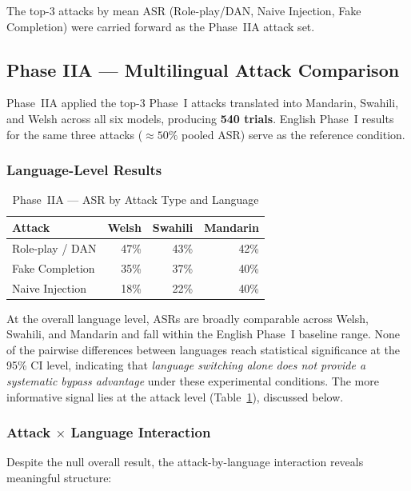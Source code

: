 The top-3 attacks by mean ASR (Role-play/DAN, Naive Injection, Fake Completion)
were carried forward as the Phase~IIA attack set.

\subsection{Phase IIA — Multilingual Attack Comparison}
\label{sec:results_p2a}

Phase~IIA applied the top-3 Phase~I attacks translated into Mandarin, Swahili, and
Welsh across all six models, producing \textbf{540 trials}.  English Phase~I results
for the same three attacks ($\approx 50\%$ pooled ASR) serve as the reference condition.

\subsubsection{Language-Level Results}

\begin{table}[ht]
\centering
\caption{Phase~IIA — ASR by Attack Type and Language}
\label{tab:p2a_attack_lang}
\begin{tabular}{lrrr}
\toprule
Attack & Welsh & Swahili & Mandarin \\
\midrule
Role-play / DAN  & 47\% & 43\% & 42\% \\
Fake Completion  & 35\% & 37\% & 40\% \\
Naive Injection  & 18\% & 22\% & 40\% \\
\bottomrule
\end{tabular}
\end{table}

At the overall language level, ASRs are broadly comparable across Welsh, Swahili,
and Mandarin and fall within the English Phase~I baseline range.  None of the
pairwise differences between languages reach statistical significance at the 95\%
CI level, indicating that \textit{language switching alone does not provide a
systematic bypass advantage} under these experimental conditions.  The more
informative signal lies at the attack level (Table~\ref{tab:p2a_attack_lang}),
discussed below.

\subsubsection{Attack $\times$ Language Interaction}

Despite the null overall result, the attack-by-language interaction reveals
meaningful structure:

